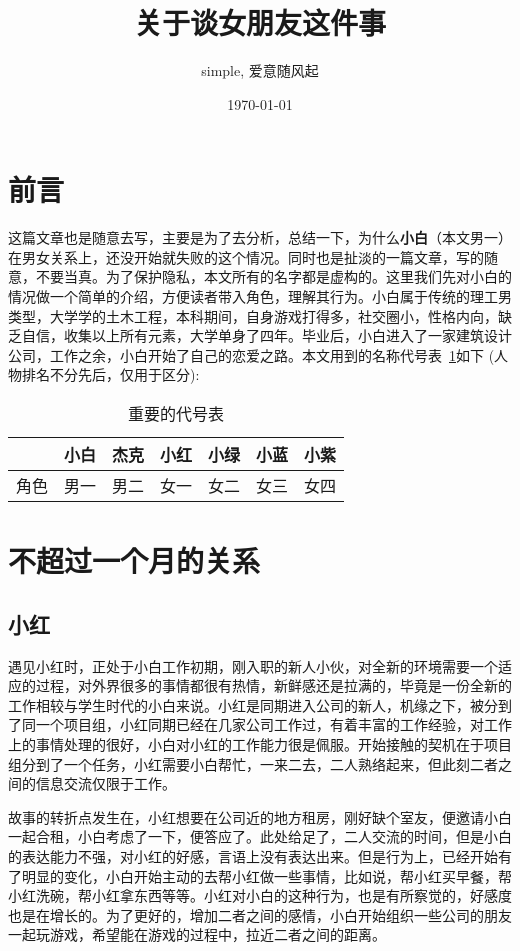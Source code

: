 \documentclass{article}
\title{\textbf{关于谈女朋友这件事}}
\author{simple, 爱意随风起}
\date{\today}
\begin{document}
\maketitle

\section{前言}
这篇文章也是随意去写，主要是为了去分析，总结一下，为什么\textbf{小白}（本文男一）在男女关系上，还没开始就失败的这个情况。同时也是扯淡的一篇文章，写的随意，不要当真。为了保护隐私，本文所有的名字都是虚构的。这里我们先对小白的情况做一个简单的介绍，方便读者带入角色，理解其行为。小白属于传统的理工男类型，大学学的土木工程，本科期间，自身游戏打得多，社交圈小，性格内向，缺乏自信，收集以上所有元素，大学单身了四年。毕业后，小白进入了一家建筑设计公司，工作之余，小白开始了自己的恋爱之路。本文用到的名称代号表~\ref{name_replace}如下 (人物排名不分先后，仅用于区分):


\begin{table}[h]
    \caption{重要的代号表}
    \label{name_replace}
    \centering
    \begin{tabular}{ccccccc}
        \toprule
        & 小白 & 杰克 & 小红 & 小绿 & 小蓝 & 小紫\\
        \midrule
        角色 & 男一 & 男二 & 女一 & 女二 & 女三 & 女四\\
        \bottomrule
    \end{tabular}
\end{table}


\section{不超过一个月的关系}
\subsection{小红}
遇见小红时，正处于小白工作初期，刚入职的新人小伙，对全新的环境需要一个适应的过程，对外界很多的事情都很有热情，新鲜感还是拉满的，毕竟是一份全新的工作相较与学生时代的小白来说。小红是同期进入公司的新人，机缘之下，被分到了同一个项目组，小红同期已经在几家公司工作过，有着丰富的工作经验，对工作上的事情处理的很好，小白对小红的工作能力很是佩服。开始接触的契机在于项目组分到了一个任务，小红需要小白帮忙，一来二去，二人熟络起来，但此刻二者之间的信息交流仅限于工作。

故事的转折点发生在，小红想要在公司近的地方租房，刚好缺个室友，便邀请小白一起合租，小白考虑了一下，便答应了。此处给足了，二人交流的时间，但是小白的表达能力不强，对小红的好感，言语上没有表达出来。但是行为上，已经开始有了明显的变化，小白开始主动的去帮小红做一些事情，比如说，帮小红买早餐，帮小红洗碗，帮小红拿东西等等。小红对小白的这种行为，也是有所察觉的，好感度也是在增长的。为了更好的，增加二者之间的感情，小白开始组织一些公司的朋友一起玩游戏，希望能在游戏的过程中，拉近二者之间的距离。
\end{document}
